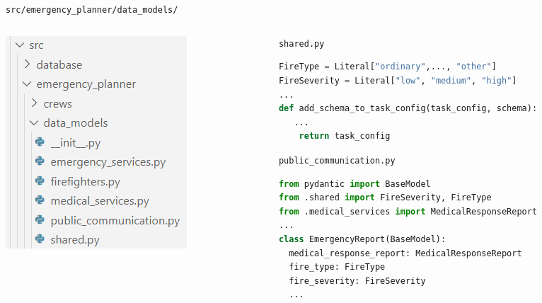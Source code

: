 \begin{frame}[fragile]{\texttt{src/emergency\_planner/data\_models/}}
  \begin{columns}[c]
    \begin{column}{0.3\textwidth}
        \includegraphics[width=\textwidth]{figures/data_models_folder.png}
    \end{column}
    \begin{column}{0.68\textwidth}
      \texttt{shared.py}
      \begin{lstlisting}[language=Python, breaklines=true]
FireType = Literal["ordinary",..., "other"]
FireSeverity = Literal["low", "medium", "high"]
... 
def add_schema_to_task_config(task_config, schema):
   ...
    return task_config
      \end{lstlisting}
      \texttt{public\_communication.py}
      \begin{lstlisting}[language=Python, breaklines=true]
from pydantic import BaseModel
from .shared import FireSeverity, FireType
from .medical_services import MedicalResponseReport
...
class EmergencyReport(BaseModel):
  medical_response_report: MedicalResponseReport
  fire_type: FireType
  fire_severity: FireSeverity
  ...
      \end{lstlisting}
    \end{column}
  \end{columns}
\end{frame}